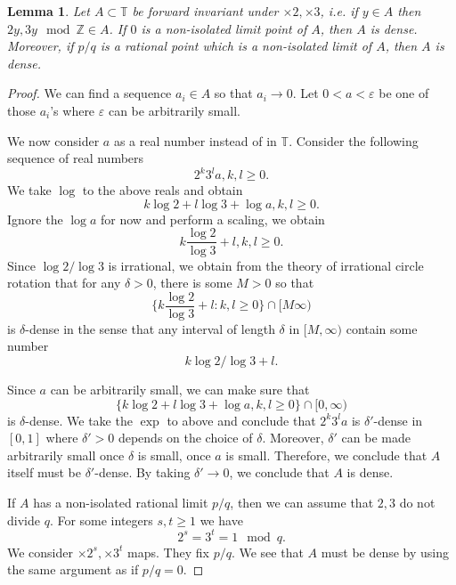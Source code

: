 \documentclass[12pt]{article}
\newtheorem{lemma}[theorem]{Lemma}
\theoremstyle{definition}
\theoremstyle{remark}
\begin{document}
\begin{lemma}
Let $A\subset\mathbb{T}$ be forward invariant under $\times 2, \times 3$, i.e. if $y\in A$ then $2y, 3y\mod\mathbb{Z}\in A$. If $0$ is a non-isolated limit point of $A$, then $A$ is dense. Moreover, if $p/q$ is a rational point which is a non-isolated limit of $A$, then $A$ is dense.
\end{lemma}
\begin{proof}
    We can find a sequence $a_i\in A$ so that $a_i\to 0$. Let $0<a<\varepsilon$ be one of those $a_i$'s where $\varepsilon$ can be arbitrarily small.

    We now consider $a$ as a real number instead of in $\mathbb{T}$. Consider the following sequence of real numbers
    \[
    2^k3^l a,k,l\geq 0.
    \]
    We take $\log$ to the above reals and obtain
    \[
    k\log 2+l\log 3+\log a,k,l\geq 0.
    \]
    Ignore the $\log a$ for now and perform a scaling, we obtain
    \[
    k \frac{\log 2}{\log 3}+l,k,l\geq 0.
    \]
    Since $\log 2/\log 3$ is irrational, we obtain from the theory of irrational circle rotation that for any $\delta>0$, there is some $M>0$ so that
    \[
    \{k \frac{\log 2}{\log 3}+l: k,l\geq 0\}\cap [M\infty)
    \]
    is $\delta$-dense in the sense that any interval of length $\delta$ in $[M,\infty)$ contain some number \[k\log 2/\log 3+l.\]

    Since $a$ can be arbitrarily small, we can make sure that
    \[
    \{k\log 2+l\log 3+\log a,k,l\geq 0\}\cap [0,\infty)
    \]
    is $\delta$-dense. We take the $\exp$ to above and conclude that $2^k3^la$ is $\delta'$-dense in $[0,1]$ where $\delta'>0$ depends on the choice of $\delta$. Moreover, $\delta'$ can be made arbitrarily small once $\delta$ is small, once $a$ is small. Therefore, we conclude that $A$ itself must be $\delta'$-dense. By taking $\delta'\to 0$, we conclude that $A$ is dense.

    If $A$ has a non-isolated rational limit $p/q$, then we can assume that $2,3$ do not divide $q$. For some integers $s,t\geq 1$ we have
    \[
    2^s=3^t=1\mod q.
    \]
    We consider $\times 2^s,\times 3^t$ maps. They fix $p/q$. We see that $A$ must be dense by using the same argument as if $p/q=0.$
\end{proof}
\end{document}
